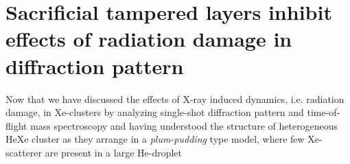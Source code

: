 \section{Sacrificial tampered layers inhibit effects of radiation damage in diffraction pattern}\label{sec:helium-xenon-data}
Now that we have discussed the effects of X-ray induced dynamics, i.e. radiation damage, in Xe-clusters by analyzing single-shot diffraction pattern and time-of-flight mass spectroscopy and having understood the structure of heterogeneous HeXe cluster as they arrange in a \textit{plum-pudding} type model, where few Xe-scatterer are present in a large He-droplet
%
%
%
%
%
%
%
%
%
%
%
%
%
%
%
%
%
%